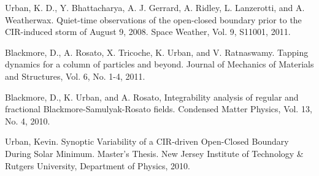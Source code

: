 \begin{itemize*}
  \item \label{sw-2011-quiet-time}
    Urban, K. D., Y. Bhattacharya, A. J. Gerrard, A. Ridley, L. Lanzerotti,
    and A. Weatherwax.
    Quiet-time observations of the open-closed boundary prior to the CIR-induced storm of August 9, 2008.
    Space Weather, Vol. 9, S11001, 2011.

  \item \label{itm:gran-2011-tapping}
    Blackmore, D., A. Rosato, X. Tricoche, K. Urban, and V. Ratnaswamy.
    Tapping dynamics for a column of particles and beyond.
    Journal of Mechanics of Materials and Structures, Vol. 6, No. 1-4, 2011.

  \item \label{itm:gran-2010-fractional}
    Blackmore, D., K. Urban, and A. Rosato,
    Integrability analysis of regular and fractional Blackmore-Samulyak-Rosato fields.
    Condensed Matter Physics, Vol. 13, No. 4, 2010. 

  \item \label{itm:sw-2010-masters}
    Urban, Kevin.
    Synoptic Variability of a {CIR}-driven Open-{C}losed Boundary During Solar Minimum.
    Master's Thesis. New Jersey Institute of Technology \& Rutgers University,
    Department of Physics, 2010.

\end{itemize*}

